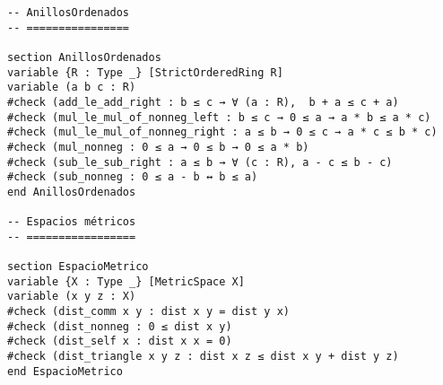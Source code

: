 \begin{verbatim}
-- AnillosOrdenados
-- ================

section AnillosOrdenados
variable {R : Type _} [StrictOrderedRing R]
variable (a b c : R)
#check (add_le_add_right : b ≤ c → ∀ (a : R),  b + a ≤ c + a)
#check (mul_le_mul_of_nonneg_left : b ≤ c → 0 ≤ a → a * b ≤ a * c)
#check (mul_le_mul_of_nonneg_right : a ≤ b → 0 ≤ c → a * c ≤ b * c)
#check (mul_nonneg : 0 ≤ a → 0 ≤ b → 0 ≤ a * b)
#check (sub_le_sub_right : a ≤ b → ∀ (c : R), a - c ≤ b - c)
#check (sub_nonneg : 0 ≤ a - b ↔ b ≤ a)
end AnillosOrdenados

-- Espacios métricos
-- =================

section EspacioMetrico
variable {X : Type _} [MetricSpace X]
variable (x y z : X)
#check (dist_comm x y : dist x y = dist y x)
#check (dist_nonneg : 0 ≤ dist x y)
#check (dist_self x : dist x x = 0)
#check (dist_triangle x y z : dist x z ≤ dist x y + dist y z)
end EspacioMetrico
\end{verbatim}


